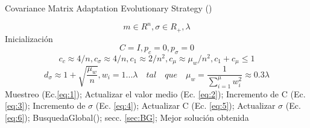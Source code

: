 
\begin{algorithm}[!ht]
  \caption{Covariance Matrix Adaptation Evolutionary Strategy (\mbox{})}
  \label{pseu:cmaes}
  \begin{algorithmic}[1]
    \REQUIRE \[ m\in R^{n}, \sigma\in R_{+}, \lambda\]
    \STATE Inicialización 
    \[C = I, p_{c} = 0, p_{\sigma} = 0\]
    \[ c_{c}\approx 4/n, c_{\sigma}\approx 4/n, c_{1}\approx 2/n^2, c_{\mu}\approx \mu_{w}/n^2, c_{1} + c_{\mu}\leq 1\]
    \[ d_{\sigma}\approx 1+\sqrt{\frac{\mu_{w}}{n}}, 
    w_{i}=1...\lambda \quad tal\quad que \quad \mu_{w} = \frac{1}{\sum_{i=1}^{\mu}w_{i}^2}\approx 0.3\lambda\]
      \STATE Muestreo (Ec.\ref{eq:1});
      \STATE Actualizar el valor medio (Ec. \ref{eq:2});
      \STATE Incremento de C (Ec. \ref{eq:3});
      \STATE Incremento de $\sigma$ (Ec. \ref{eq:4});
      \STATE Actualizar C (Ec. \ref{eq:5});
      \STATE Actualizar $\sigma$ (Ec. \ref{eq:6});
      \STATE BusquedaGlobal(); secc. \ref{sec:BG};
        \ENDIF
    \ENDWHILE
    \RETURN Mejor solución obtenida
  \end{algorithmic}
\end{algorithm}